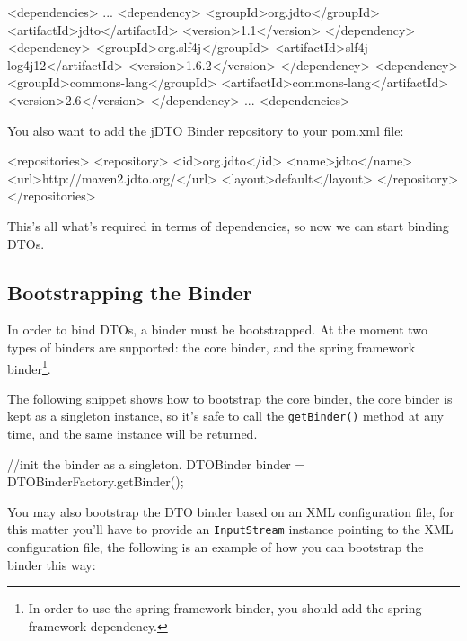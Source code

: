 \documentclass[11pt]{article}
\newcommand{\JDTO}{jDTO Binder\xspace}
\begin{document}
\begin{xml}
     <dependencies>
     ...
        <dependency>
            <groupId>org.jdto</groupId>
            <artifactId>jdto</artifactId>
            <version>1.1</version>
        </dependency>
        <dependency>
            <groupId>org.slf4j</groupId>
            <artifactId>slf4j-log4j12</artifactId>
            <version>1.6.2</version>
        </dependency>
        <dependency>
            <groupId>commons-lang</groupId>
            <artifactId>commons-lang</artifactId>
            <version>2.6</version>
        </dependency>
     ...
     <dependencies>
\end{xml}

You also want to add the \JDTO repository to your pom.xml file:

\begin{xml}
     <repositories>
        <repository>
            <id>org.jdto</id>
            <name>jdto</name>
            <url>http://maven2.jdto.org/</url>
            <layout>default</layout>
        </repository>
    </repositories>
\end{xml}

This's all what's required in terms of dependencies, so now we can start binding DTOs.

\subsection{Bootstrapping the Binder}


In order to bind DTOs, a binder must be bootstrapped. At the moment two types of binders
are supported: the core binder, and the spring framework binder\footnote{In order to use the spring framework binder, you should add the spring framework dependency.}.


The following snippet shows how to bootstrap the core binder, the core binder is kept as a singleton instance, so it's safe to call the \texttt{getBinder()} method at any time, and the same instance will be returned.


\begin{java}
//init the binder as a singleton.
DTOBinder binder = DTOBinderFactory.getBinder();
\end{java}

You may also bootstrap the DTO binder based on an XML configuration file, for this matter you'll have to provide an \texttt{InputStream} instance pointing to the XML configuration file, the following is an example of how you can bootstrap the binder this way:
\end{document}
